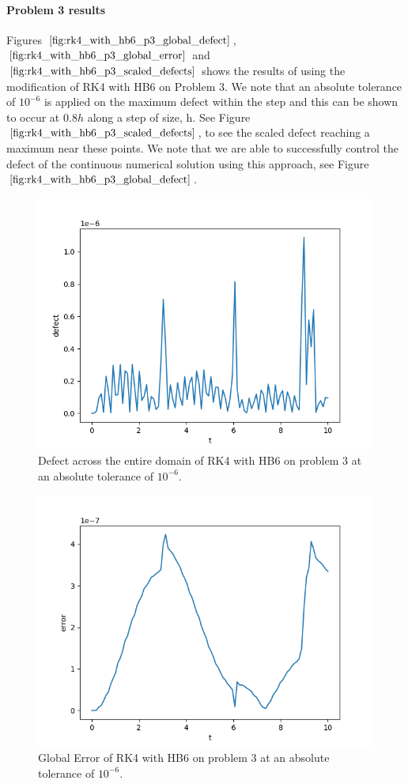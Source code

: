 \documentclass{article}
\begin{document}
\paragraph{Problem 3 results}
Figures $\ref{fig:rk4_with_hb6_p3_global_defect}$, $\ref{fig:rk4_with_hb6_p3_global_error}$ and $\ref{fig:rk4_with_hb6_p3_scaled_defects}$ shows the results of using the modification of RK4 with HB6 on Problem 3. We note that an absolute tolerance of $10^{-6}$ is applied on the maximum defect within the step and this can be shown to occur at $0.8h$ along a step of size, h. See Figure $\ref{fig:rk4_with_hb6_p3_scaled_defects}$, to see the scaled defect reaching a maximum near these points. We note that we are able to successfully control the defect of the continuous numerical solution using this approach, see Figure $\ref{fig:rk4_with_hb6_p3_global_defect}$. 


\begin{figure}[H]
\centering
\includegraphics[width=0.7\linewidth]{./figures/rk4_with_hb6_p3_global_defect}
\caption{Defect across the entire domain of RK4 with HB6 on problem 3 at an absolute tolerance of $10^{-6}$.}
\label{fig:rk4_with_hb6_p3_global_defect}
\end{figure}

\begin{figure}[H]
\centering
\includegraphics[width=0.7\linewidth]{./figures/rk4_with_hb6_p3_global_error}
\caption{Global Error of RK4 with HB6 on problem 3 at an absolute tolerance of $10^{-6}$.}
\label{fig:rk4_with_hb6_p3_global_error}
\end{figure}
\end{document}
